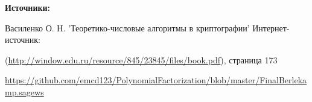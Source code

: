 \documentclass[12pt,a4paper]{scrartcl}
\begin{document}
\textbf{Источники:}

Василенко О. Н. 'Теоретико-числовые алгоритмы в криптографии' Интернет-источник: 

(\href{http://window.edu.ru/resource/845/23845/files/book.pdf}{http://window.edu.ru/resource/845/23845/files/book.pdf}), страница 173

\href{https://github.com/emcd123/PolynomialFactorization/blob/master/FinalBerlekamp.sagews}{https://github.com/emcd123/PolynomialFactorization/blob/master/FinalBerlekamp.sagews}
	
\end{document}
